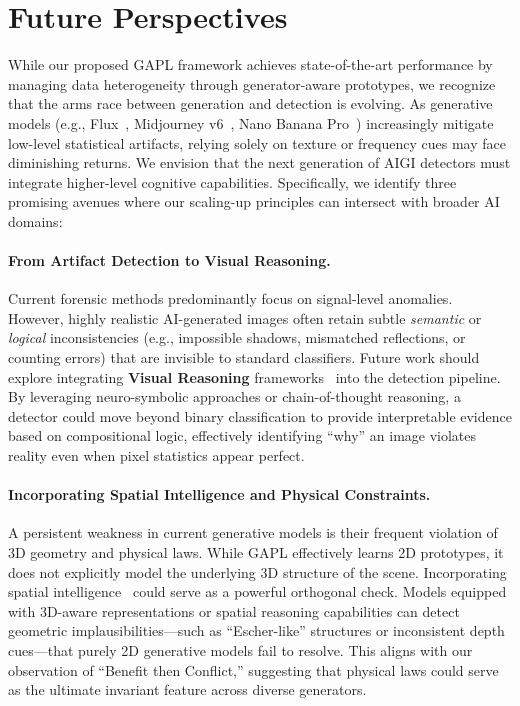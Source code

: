 \section{Future Perspectives}
\label{sec:future}

While our proposed GAPL framework achieves state-of-the-art performance by managing data heterogeneity through generator-aware prototypes, we recognize that the arms race between generation and detection is evolving. As generative models (e.g., Flux~\cite{blackforestlabs2024flux}, Midjourney v6~\cite{midjourneyv6}, Nano Banana Pro~\cite{banana}) increasingly mitigate low-level statistical artifacts, relying solely on texture or frequency cues may face diminishing returns. We envision that the next generation of AIGI detectors must integrate higher-level cognitive capabilities. Specifically, we identify three promising avenues where our scaling-up principles can intersect with broader AI domains:

\paragraph{From Artifact Detection to Visual Reasoning.}
Current forensic methods predominantly focus on signal-level anomalies. However, highly realistic AI-generated images often retain subtle \textit{semantic} or \textit{logical} inconsistencies (e.g., impossible shadows, mismatched reflections, or counting errors) that are invisible to standard classifiers. Future work should explore integrating \textbf{Visual Reasoning} frameworks~\cite{tanreason, ji2025mathsticks, ji2025visualtrans,song2025maniplvm} into the detection pipeline. By leveraging neuro-symbolic approaches or chain-of-thought reasoning, a detector could move beyond binary classification to provide interpretable evidence based on compositional logic, effectively identifying ``why'' an image violates reality even when pixel statistics appear perfect.

\paragraph{Incorporating Spatial Intelligence and Physical Constraints.}
A persistent weakness in current generative models is their frequent violation of 3D geometry and physical laws. While GAPL effectively learns 2D prototypes, it does not explicitly model the underlying 3D structure of the scene. Incorporating {spatial intelligence}~\cite{ji2025robobrain,team2025robobrain,wang2025crosspoint} could serve as a powerful orthogonal check. Models equipped with 3D-aware representations or spatial reasoning capabilities can detect geometric implausibilities—such as ``Escher-like'' structures or inconsistent depth cues—that purely 2D generative models fail to resolve. This aligns with our observation of ``Benefit then Conflict,'' suggesting that physical laws could serve as the ultimate invariant feature across diverse generators.

